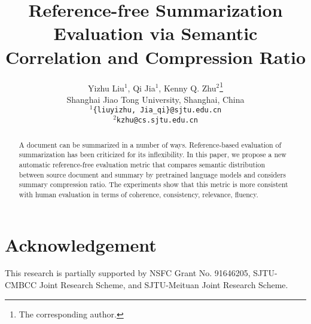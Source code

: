 \documentclass[11pt]{article}
\title{Reference-free Summarization Evaluation via Semantic Correlation and Compression Ratio}
\author{Yizhu Liu$^1$, Qi Jia$^1$, Kenny Q. Zhu$^2$\textsuperscript{\rm}\thanks{\hspace{2mm}The corresponding author.}\\
	Shanghai Jiao Tong University, Shanghai, China \\
	\texttt{$^1$\{liuyizhu, Jia\_qi\}@sjtu.edu.cn} \\
	\texttt{$^2$kzhu@cs.sjtu.edu.cn}\\
}
\begin{document}
\maketitle
\begin{abstract}
A document can be summarized in a number of ways.
Reference-based evaluation of summarization has been
criticized for its inflexibility. 
In this paper, we propose a new automatic reference-free 
evaluation metric that compares semantic distribution between 
source document and summary by pretrained language models 
and considers summary compression ratio.
The experiments show that this metric is more consistent 
with human evaluation in terms of coherence, consistency, 
relevance, fluency.
\end{abstract}






% 

\section*{Acknowledgement}
This research is partially supported by NSFC Grant No. 91646205, SJTU-CMBCC Joint Research Scheme, and
SJTU-Meituan Joint Research Scheme.

\end{document}
